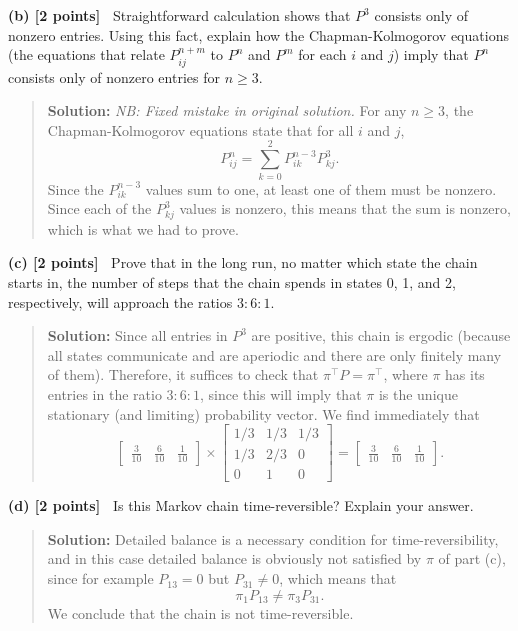 \documentclass{article}
\newcommand{\svskip}{\vspace{.2in}}
\begin{document}
\svskip 
{\bf(b) [2 points]\ }  
Straightforward calculation shows that
$P^3$ consists only of nonzero entries.
Using this fact, explain how the Chapman-Kolmogorov equations (the equations that relate
$P_{ij}^{n+m}$ to $P^n$ and $P^m$ for each $i$ and $j$) imply that
 $P^n$ consists only of nonzero entries for $n\ge 3$.
  \begin{quotation}{\bf Solution:}
  {\em NB:  Fixed mistake in original solution.}
  For any $n\ge 3$, the Chapman-Kolmogorov equations state that
  for all $i$ and $j$,
  \[
  P_{ij}^{n} = \sum_{k=0}^2 P_{ik}^{n-3}P_{kj}^3.  
  \]
  Since the $P_{ik}^{n-3}$ values sum to one, at least one of them must be nonzero.  Since each of the 
  $P_{kj}^3$ values is nonzero, this means that the sum is nonzero, which is what we had to prove.
  \end{quotation}
  

\svskip 
{\bf(c) [2 points]\ }  
Prove that in the long run, no matter which state the chain starts in, the number of steps 
that the chain spends in states 0, 1, and 2, respectively, will approach the
ratios $3:6:1$.
  \begin{quotation}{\bf Solution:}
  Since all entries in $P^3$ are positive, this chain is ergodic (because 
  all states communicate and are 
  aperiodic and there are only finitely many of them).  Therefore, it suffices to 
  check that
  $\pi^\top P=\pi^\top$, where $\pi$ has its entries in the ratio $3:6:1$,
  since this will imply that $\pi$ is the unique stationary (and limiting)
  probability vector.   We find immediately that
  \[
  \begin{bmatrix}
  \frac3{10} & \frac6{10} & \frac1{10}
  \end{bmatrix}
  \times
  \begin{bmatrix}
  1/3 & 1/3 & 1/3 \\ 
  1/3 & 2/3 & 0 \\
  0 & 1 & 0
  \end{bmatrix}
  =
  \begin{bmatrix}
  \frac3{10} & \frac6{10} & \frac1{10}
  \end{bmatrix}.
  \]
  \end{quotation}

\svskip 
{\bf(d) [2 points]\ }  
Is this Markov chain time-reversible? Explain your answer.
  \begin{quotation}{\bf Solution:}
  Detailed balance is a necessary condition for time-reversibility, and in this case
  detailed balance is obviously not satisfied by $\pi$ of part (c), since for example
  $P_{13}=0$ but $P_{31}\ne 0$, which means that
  \[
  \pi_1P_{13} \ne \pi_3P_{31}.
  \]
  We conclude that the chain is not time-reversible.
  \end{quotation}
\end{document}
